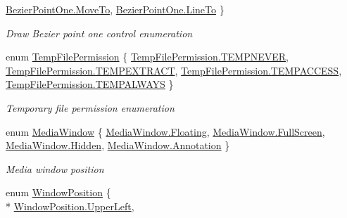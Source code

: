 \begin{DoxyCompactItemize}
\hyperlink{namespace_pdf_file_writer_a12a19c6c1faeda33d34ad5a36130b1bfad9046d3b1ebf3889943b3be3ca477613}{Bezier\+Point\+One.\+Move\+To}, 
\hyperlink{namespace_pdf_file_writer_a12a19c6c1faeda33d34ad5a36130b1bfa5dc59cf06f56c730c0a4bfe69c9bf689}{Bezier\+Point\+One.\+Line\+To}
 \}\begin{DoxyCompactList}\small\item\em Draw Bezier point one control enumeration \end{DoxyCompactList}
\item 
enum \hyperlink{namespace_pdf_file_writer_a7714a72b0a64df6288ea710b8092d8bb}{Temp\+File\+Permission} \{ \hyperlink{namespace_pdf_file_writer_a7714a72b0a64df6288ea710b8092d8bba0b12bf08389d1d9e317ecebd10359ff5}{Temp\+File\+Permission.\+T\+E\+M\+P\+N\+E\+V\+ER}, 
\hyperlink{namespace_pdf_file_writer_a7714a72b0a64df6288ea710b8092d8bbab4b8b7c26495d1594c6587528cc3bdcb}{Temp\+File\+Permission.\+T\+E\+M\+P\+E\+X\+T\+R\+A\+CT}, 
\hyperlink{namespace_pdf_file_writer_a7714a72b0a64df6288ea710b8092d8bbae034ab34a0461afc67b0affc7ca92a76}{Temp\+File\+Permission.\+T\+E\+M\+P\+A\+C\+C\+E\+SS}, 
\hyperlink{namespace_pdf_file_writer_a7714a72b0a64df6288ea710b8092d8bbab70d669a0287f83ebb47032b3fc9f572}{Temp\+File\+Permission.\+T\+E\+M\+P\+A\+L\+W\+A\+YS}
 \}\begin{DoxyCompactList}\small\item\em Temporary file permission enumeration \end{DoxyCompactList}
\item 
enum \hyperlink{namespace_pdf_file_writer_a653ef272c573dc41330054386c178f69}{Media\+Window} \{ \hyperlink{namespace_pdf_file_writer_a653ef272c573dc41330054386c178f69ac8df43648942ec3a9aec140f07f47b7c}{Media\+Window.\+Floating}, 
\hyperlink{namespace_pdf_file_writer_a653ef272c573dc41330054386c178f69ae7ec409749889353b8f83a6b04159420}{Media\+Window.\+Full\+Screen}, 
\hyperlink{namespace_pdf_file_writer_a653ef272c573dc41330054386c178f69a7acdf85c69cc3c5305456a293524386e}{Media\+Window.\+Hidden}, 
\hyperlink{namespace_pdf_file_writer_a653ef272c573dc41330054386c178f69a55f6611cb342565cf0f5002400f53a95}{Media\+Window.\+Annotation}
 \}\begin{DoxyCompactList}\small\item\em Media window position \end{DoxyCompactList}
\item 
enum \hyperlink{namespace_pdf_file_writer_a096e8344234e0e62db8e6ce21ef3c41d}{Window\+Position} \{ \\*
\hyperlink{namespace_pdf_file_writer_a096e8344234e0e62db8e6ce21ef3c41da6f43ca0793e0c68184761673278f4ca4}{Window\+Position.\+Upper\+Left}, 

\end{DoxyCompactItemize}
